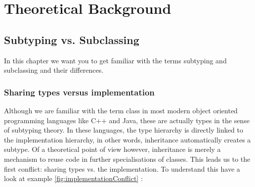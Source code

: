 
\part{Theoretical Background}
\chapter{Subtyping vs. Subclassing}
In this chapter we want you to get familiar with the terms subtyping
and subclassing and their differences.  \\

\section{Sharing types versus implementation}
Although we are familiar with the term class in most modern object oriented
programming languages like C++ and Java, these are actually types in the sense
of subtyping theory. In these languages, the type hierarchy is directly linked
to the implementation hierarchy, in other words, inheritance automatically 
creates a subtype. Of a theoretical point of view however, inheritance is merely
a mechanism to reuse code in further specialisations of classes. This leads us
to the first conflict: sharing types vs. the implementation. To understand this
have a look at example \ref{fig:implementationConflict} \cite{simons_theory_2003-4}: %

